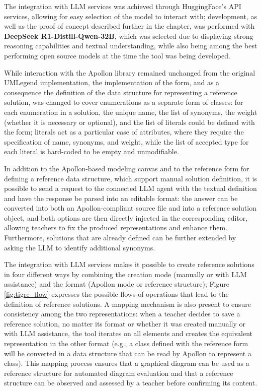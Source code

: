 The integration with LLM services was achieved through HuggingFace's API services, allowing for easy selection of the model to interact with; development, as well as the proof of concept described further in the chapter, was performed with \textbf{DeepSeek R1-Distill-Qwen-32B}, which was selected due to displaying strong reasoning capabilities and textual understanding, while also being among the best performing open source models at the time the tool was being developed.

While interaction with the Apollon library remained unchanged from the original UMLegend implementation, the implementation of the form, and as a consequence the definition of the data structure for representing a reference solution, was changed to cover enumerations as a separate form of classes: for each enumeration in a solution, the unique name, the list of synonyms, the weight (whether it is necessary or optional), and the list of literals could be defined with the form; literals act as a particular case of attributes, where they require the specification of name, synonyms, and weight, while the list of accepted type for each literal is hard-coded to be empty and unmodifiable.

In addition to the Apollon-based modeling canvas and to the reference form for defining a reference data structure, which support manual solution definition, it is possible to send a request to the connected LLM agent with the textual definition and have the response be parsed into an editable format: the answer can be converted into both an Apollon-compliant source file and into a reference solution object, and both options are then directly injected in the corresponding editor, allowing teachers to fix the produced representations and enhance them. Furthermore, solutions that are already defined can be further extended by asking the LLM to identify additional synonyms. 

The integration with LLM services makes it possible to create reference solutions in four different ways by combining the creation mode (manually or with LLM assistance) and the format (Apollon mode or reference structure); Figure \ref{fig:tigre_flow} expresses the possible flows of operations that lead to the definition of reference solutions. A mapping mechanism is also present to ensure consistency among the two representations: when a teacher decides to save a reference solution, no matter its format or whether it was created manually or with LLM assistance, the tool iterates on all elements and creates the equivalent representation in the other format (e.g., a class defined with the reference form will be converted in a data structure that can be read by Apollon to represent a class). This mapping process ensures that a graphical diagram can be used as a reference structure for automated diagram evaluation and that a reference structure can be observed and assessed by a teacher before confirming its content. 


